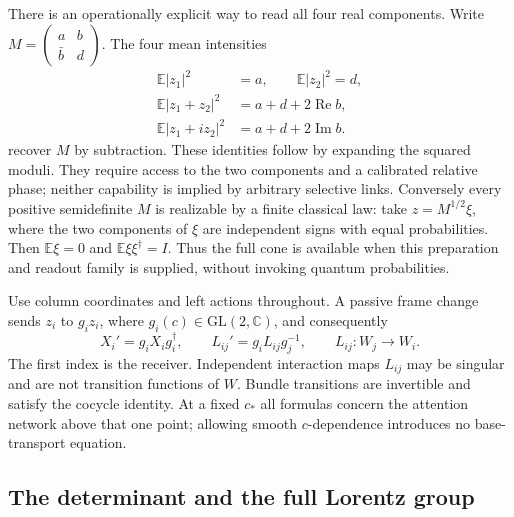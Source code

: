 There is an operationally explicit way to read all four real components. Write $M=\left(\begin{smallmatrix}a&b\\\bar b&d\end{smallmatrix}\right)$. The four mean intensities
\begin{equation}
\begin{aligned}
\mathbb E|z_1|^2&=a,\qquad \mathbb E|z_2|^2=d,\\
\mathbb E|z_1+z_2|^2&=a+d+2\operatorname{Re}b,\\
\mathbb E|z_1+iz_2|^2&=a+d+2\operatorname{Im}b.
\end{aligned}
\label{eq:lor-classical-tomography}
\end{equation}
recover $M$ by subtraction. These identities follow by expanding the squared moduli. They require access to the two components and a calibrated relative phase; neither capability is implied by arbitrary selective links. Conversely every positive semidefinite $M$ is realizable by a finite classical law: take $z=M^{1/2}\xi$, where the two components of $\xi$ are independent signs with equal probabilities. Then $\mathbb E\xi=0$ and $\mathbb E\xi\xi^\dagger=I$. Thus the full cone is available when this preparation and readout family is supplied, without invoking quantum probabilities.

Use column coordinates and left actions throughout. A passive frame change sends $z_i$ to $g_i z_i$, where $g_i(c)\in\mathrm{GL}(2,\mathbb C)$, and consequently
\begin{equation}
X_i'=g_iX_ig_i^\dagger,\qquad
L_{ij}'=g_iL_{ij}g_j^{-1},\qquad
L_{ij}:W_j\longrightarrow W_i.
\label{eq:lor-frame-laws}
\end{equation}
The first index is the receiver. Independent interaction maps $L_{ij}$ may be singular and are not transition functions of $W$. Bundle transitions are invertible and satisfy the cocycle identity. At a fixed $c_*$ all formulas concern the attention network above that one point; allowing smooth $c$-dependence introduces no base-transport equation.

\subsection{The determinant and the full Lorentz group}
\label{sec:worked_signature}


